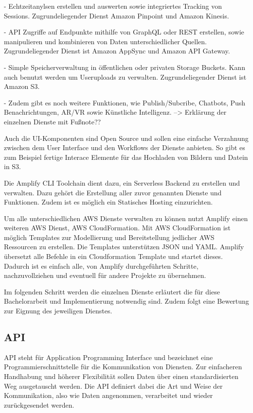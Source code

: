 - Echtzeitanylsen erstellen und auswerten sowie integriertes Tracking von Sessions. Zugrundeliegender Dienst Amazon Pinpoint und Amazon Kinesis.

- API Zugriffe auf Endpunkte mithilfe von GraphQL oder REST erstellen, sowie manipulieren und kombinieren von Daten unterschiedlicher Quellen. Zugrundeliegender Dienst ist Amazon AppSync und Amazon API Gateway.

- Simple Speicherverwaltung in öffentlichen oder privaten Storage Buckets. Kann auch benutzt werden um Useruploads zu verwalten. Zugrundeliegender Dienst ist Amazon S3.

- Zudem gibt es noch weitere Funktionen, wie Publish/Subcribe, Chatbots, Push Benachrichtungen, AR/VR sowie Künstliche Intelligenz.
--> Erklärung der einzelnen Dienste mit Fußnote??


Auch die UI-Komponenten sind Open Source und sollen eine einfache Verzahnung zwischen dem User Interface und den Workflows der Dienste anbieten.
So gibt es zum Beispiel fertige Interace Elemente für das Hochladen von Bildern und Datein in S3.

Die Amplify CLI Toolchain dient dazu, ein Serverless Backend zu erstellen und verwalten. Dazu gehört die Erstellung aller zuvor genannten Dienste und Funktionen. Zudem
ist es möglich ein Statisches Hosting einzurichten. \cite[]{AWSAmplifyKomponenten}


Um alle unterschiedlichen AWS Dienste verwalten zu können nutzt Amplify einen weiteren AWS Dienst, AWS CloudFormation.
Mit AWS CloudFormation ist möglich Templates zur Modellierung und Bereitstellung jedlicher AWS Ressourcen zu erstellen. Die Templates unterstützen
JSON und YAML. Amplify übersetzt alle Befehle in ein Cloudformation Template und startet dieses. Dadurch ist es einfach alle, von Amplify durchgeführten Schritte,
nachzuvollziehen und eventuell für andere Projekte zu übernehmen.

Im folgenden Schritt werden die einzelnen Dienste erläutert die für diese Bachelorarbeit und Implementierung notwendig sind.
Zudem folgt eine Bewertung zur Eignung des jeweiligen Dienstes.




\subsection{API}
API steht für Application Programming Interface und bezeichnet eine Programmierschnittstelle für die Kommunikation von Diensten.
Zur einfacheren Handhabung und höherer Flexibilität sollen Daten über einen standardisierten Weg ausgetauscht werden. Die API definiert
dabei die Art und Weise der Kommunikation, also wie Daten angenommen, verarbeitet und wieder zurückgesendet werden.



